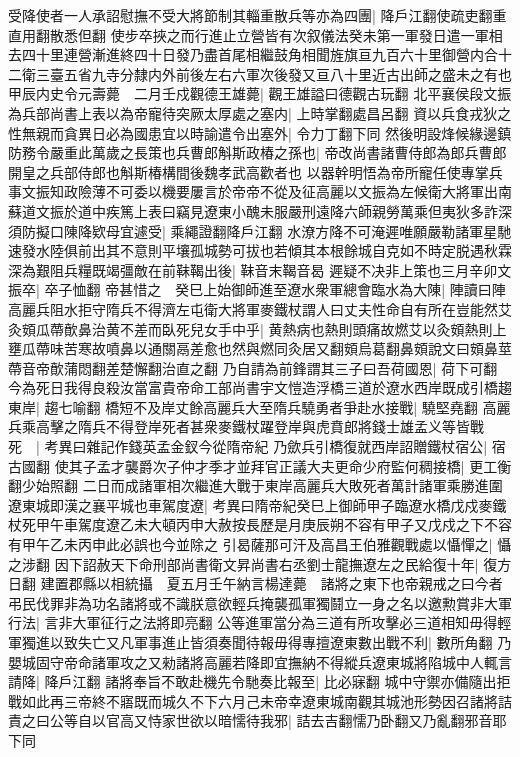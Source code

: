 受降使者一人承詔慰撫不受大將節制其輜重散兵等亦為四團|{
	降戶江翻使疏吏翻重直用翻散悉但翻}
使步卒挾之而行進止立營皆有次叙儀法癸未第一軍發日遣一軍相去四十里連營漸進終四十日發乃盡首尾相繼鼓角相聞旌旗亘九百六十里御營内合十二衛三臺五省九寺分隸内外前後左右六軍次後發又亘八十里近古出師之盛未之有也　甲辰内史令元壽薨　二月壬戍觀德王雄薨|{
	觀王雄謚曰德觀古玩翻}
北平襄侯段文振為兵部尚書上表以為帝寵待突厥太厚處之塞内|{
	上時掌翻處昌呂翻}
資以兵食戎狄之性無親而貪異日必為國患宜以時諭遣令出塞外|{
	令力丁翻下同}
然後明設烽候緣邊鎮防務令嚴重此萬歲之長策也兵曹郎斛斯政椿之孫也|{
	帝改尚書諸曹侍郎為郎兵曹郎開皇之兵部侍郎也斛斯椿構間後魏孝武高歡者也}
以器幹明悟為帝所寵任使專掌兵事文振知政險薄不可委以機要屢言於帝帝不從及征高麗以文振為左候衛大將軍出南蘇道文振於道中疾篤上表曰竊見遼東小醜未服嚴刑遠降六師親勞萬乘但夷狄多詐深須防擬口陳降欵母宜遽受|{
	乘繩證翻降戶江翻}
水潦方降不可淹遲唯願嚴勒諸軍星馳速發水陸俱前出其不意則平壤孤城勢可拔也若傾其本根餘城自克如不時定脱遇秋霖深為艱阻兵糧既竭彊敵在前靺鞨出後|{
	靺音末鞨音曷}
遲疑不决非上策也三月辛卯文振卒|{
	卒子恤翻}
帝甚惜之　癸巳上始御師進至遼水衆軍總會臨水為大陳|{
	陣讀曰陣}
高麗兵阻水拒守隋兵不得濟左屯衛大將軍麥鐵杖謂人曰丈夫性命自有所在豈能然艾灸頞瓜蔕歕鼻治黄不差而臥死兒女手中乎|{
	黄熱病也熱則頭痛故燃艾以灸頞熱則上壅瓜蔕味苦寒故噴鼻以通關鬲差愈也然與燃同灸居又翻頞烏葛翻鼻頞說文曰頞鼻莖蔕音帝歕蒲悶翻差楚懈翻治直之翻}
乃自請為前鋒謂其三子曰吾荷國恩|{
	荷下可翻}
今為死日我得良殺汝當富貴帝命工部尚書宇文愷造浮橋三道於遼水西岸既成引橋趨東岸|{
	趨七喻翻}
橋短不及岸丈餘高麗兵大至隋兵驍勇者爭赴水接戰|{
	驍堅堯翻}
高麗兵乘高擊之隋兵不得登岸死者甚衆麥鐵杖躍登岸與虎賁郎將錢士雄孟义等皆戰死　|{
	考異曰雜記作錢英孟金釵今從隋帝紀}
乃歛兵引橋復就西岸詔贈鐵杖宿公|{
	宿古國翻}
使其子孟才襲爵次子仲才季才並拜官正議大夫更命少府監何稠接橋|{
	更工衡翻少始照翻}
二日而成諸軍相次繼進大戰于東岸高麗兵大敗死者萬計諸軍乘勝進圍遼東城即漢之襄平城也車駕度遼|{
	考異曰隋帝紀癸巳上御師甲子臨遼水橋戊戍麥鐵杖死甲午車駕度遼乙未大頓丙申大赦按長歷是月庚辰朔不容有甲子又戊戍之下不容有甲午乙未丙申此必誤也今並除之}
引曷薩那可汗及高昌王伯雅觀戰處以懾憚之|{
	懾之涉翻}
因下詔赦天下命刑部尚書衛文昇尚書右丞劉士龍撫遼左之民給復十年|{
	復方日翻}
建置郡縣以相統攝　夏五月壬午納言楊達薨　諸將之東下也帝親戒之曰今者弔民伐罪非為功名諸將或不識朕意欲輕兵掩襲孤軍獨鬪立一身之名以邀勲賞非大軍行法|{
	言非大軍征行之法將即亮翻}
公等進軍當分為三道有所攻擊必三道相知毋得輕軍獨進以致失亡又凡軍事進止皆須奏聞待報毋得專擅遼東數出戰不利|{
	數所角翻}
乃嬰城固守帝命諸軍攻之又勑諸將高麗若降即宜撫納不得縱兵遼東城將陷城中人輒言請降|{
	降戶江翻}
諸將奉旨不敢赴機先令馳奏比報至|{
	比必寐翻}
城中守禦亦備隨出拒戰如此再三帝終不寤既而城久不下六月己未帝幸遼東城南觀其城池形勢因召諸將詰責之曰公等自以官高又恃家世欲以暗懦待我邪|{
	詰去吉翻懦乃卧翻又乃亂翻邪音耶下同}
